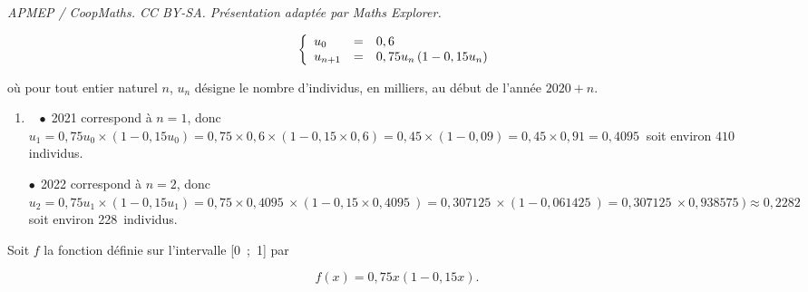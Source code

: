 \documentclass[10pt]{article}
\providecommand{\np}[2][]{{#2~#1}}
\begin{document}
\noindent\textit{APMEP / CoopMaths. CC BY-SA. Présentation adaptée par Maths Explorer.}\par\medskip
\medskip









\[\left\{\begin{array}{l c l}
u_0		&=	&0,6\\
u_{n+1}	&=	&0,75 u_n\left(1 - 0,15 u_n\right)
\end{array}\right.\]

où pour tout entier naturel $n$, $u_n$ désigne le nombre d'individus, en milliers, au début de l'année $2020 + n$.

\medskip

\begin{enumerate}
\item ~
$\bullet~~$2021 correspond à $n = 1$, donc $u_1 = 0,75u_0 \times \left(1 - 0,15u_0\right) = 0,75 \times 0,6\times (1 - 0,15 \times 0,6) = 0,45 \times (1 - 0,09) = 0,45 \times0,91 = \np{0,4095}$ soit environ $410$ individus.

$\bullet~~$2022 correspond à $n = 2$, donc $u_2 = 0,75u_1 \times \left(1 - 0,15u_1\right) = 0,75 \times \np{0,4095}\times (1 - 0,15 \times \np{0,4095}) = \np{0,307125} \times (1 - \np{0,061425}) = \np{0,307125} \times \np{0,938575}) \approx \np{0,2282}$ soit environ 228~individus.

\end{enumerate}

Soit $f$ la fonction définie sur l'intervalle [0~;~1] par 

\[f(x) = 0,75x (1 - 0,15x).\]
\end{document}
